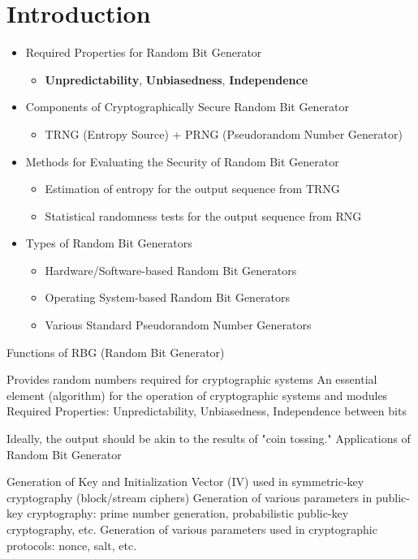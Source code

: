\documentclass[12pt,openany]{book}
\theoremstyle{definition}
\begin{document}
	\chapter{Introduction}
	\begin{tcolorbox}[colback=white,colframe=defcolor,arc=5pt,title={\color{white}\bf Summary}]
		\begin{itemize}
			\item Required Properties for Random Bit Generator
			\begin{itemize}
				\item \textbf{Unpredictability}, \textbf{Unbiasedness}, \textbf{Independence}
			\end{itemize}
			\item Components of Cryptographically Secure Random Bit Generator
			\begin{itemize}
				\item TRNG (Entropy Source) + PRNG (Pseudorandom Number Generator)
			\end{itemize}
			\item Methods for Evaluating the Security of Random Bit Generator
			\begin{itemize}
				\item Estimation of entropy for the output sequence from TRNG
				\item Statistical randomness tests for the output sequence from RNG
			\end{itemize}
			\item Types of Random Bit Generators
			\begin{itemize}
				\item Hardware/Software-based Random Bit Generators
				\item Operating System-based Random Bit Generators
				\item Various Standard Pseudorandom Number Generators
			\end{itemize}
		\end{itemize}
	\end{tcolorbox}
	Functions of RBG (Random Bit Generator)
	
	Provides random numbers required for cryptographic systems
	An essential element (algorithm) for the operation of cryptographic systems and modules
	Required Properties: Unpredictability, Unbiasedness, Independence between bits
	
	Ideally, the output should be akin to the results of "coin tossing."
	Applications of Random Bit Generator
	
	Generation of Key and Initialization Vector (IV) used in symmetric-key cryptography (block/stream ciphers)
	Generation of various parameters in public-key cryptography: prime number generation, probabilistic public-key cryptography, etc.
	Generation of various parameters used in cryptographic protocols: nonce, salt, etc.
	
\end{document}

